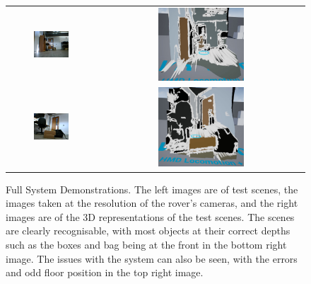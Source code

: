 \begin{figure}[H]
    \begin{center}
    \begin{tabular}{ c c }
        \includegraphics[width=0.43\textwidth,trim={0.5cm 0 1cm 0},clip]{Figures/TestScene1.jpg} &
        \includegraphics[width=0.43\textwidth]{Figures/TestUnreal1.jpg} \\
        \includegraphics[width=0.43\textwidth,trim={0.5cm 0 1.5cm 0},clip]{Figures/TestScene2.jpg} &
        \includegraphics[width=0.43\textwidth]{Figures/TestUnreal2.jpg}
    \end{tabular}
    \caption[Full System Demonstrations]{Full System Demonstrations. The left images are of test scenes, the images taken at the resolution of the rover's cameras, and the right images are of the 3D representations of the test scenes. The scenes are clearly recognisable, with most objects at their correct depths such as the boxes and bag being at the front in the bottom right image. The issues with the system can also be seen, with the errors and odd floor position in the top right image.}
    \label{fig:UDemos}
    \end{center}
\end{figure}

